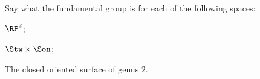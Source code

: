 Say what the fundamental group is for each of the following spaces:
\begin{alist}
\item $\RP^2$;
\item $\Stw\times \Son$;
\item The closed oriented surface of genus $2$.
\end{alist}
